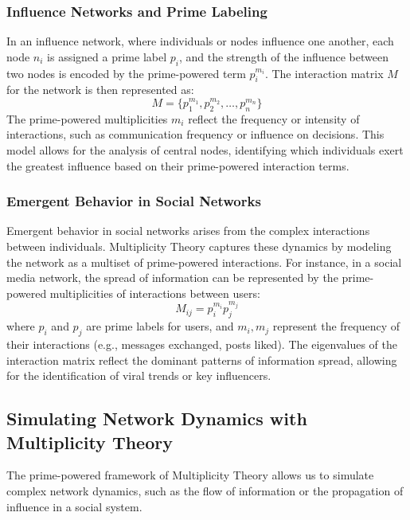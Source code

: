\documentclass[%
 preprint, linenumbers,
 amsmath,amssymb,
 aps, physrev,
]{revtex4-2}
\begin{document}
\subsubsection{Influence Networks and Prime Labeling}
In an influence network, where individuals or nodes influence one another, each node \( n_i \) is assigned a prime label \( p_i \), and the strength of the influence between two nodes is encoded by the prime-powered term \( p_i^{m_i} \). The interaction matrix \( M \) for the network is then represented as:
\[
M = \{p_1^{m_1}, p_2^{m_2}, \dots, p_n^{m_n}\}
\]
The prime-powered multiplicities \( m_i \) reflect the frequency or intensity of interactions, such as communication frequency or influence on decisions. This model allows for the analysis of central nodes, identifying which individuals exert the greatest influence based on their prime-powered interaction terms.

\subsubsection{Emergent Behavior in Social Networks}
Emergent behavior in social networks arises from the complex interactions between individuals. Multiplicity Theory captures these dynamics by modeling the network as a multiset of prime-powered interactions. For instance, in a social media network, the spread of information can be represented by the prime-powered multiplicities of interactions between users:
\[
M_{ij} = p_i^{m_i} p_j^{m_j}
\]
where \( p_i \) and \( p_j \) are prime labels for users, and \( m_i, m_j \) represent the frequency of their interactions (e.g., messages exchanged, posts liked). The eigenvalues of the interaction matrix reflect the dominant patterns of information spread, allowing for the identification of viral trends or key influencers.

\subsection{Simulating Network Dynamics with Multiplicity Theory}
The prime-powered framework of Multiplicity Theory allows us to simulate complex network dynamics, such as the flow of information or the propagation of influence in a social system.
\end{document}
